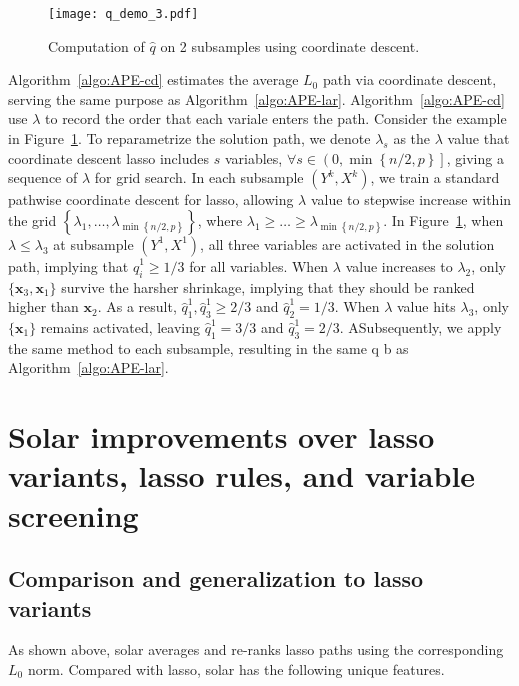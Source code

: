 \documentclass[12pt]{article}
\begin{document}
\begin{figure}[h]
  \centering
  \texttt{[image: q\_demo\_3.pdf]}
  \caption{Computation of $\widehat{q}$ on 2 subsamples using coordinate descent.}
  \label{fig:q_demo_3}
\end{figure}

Algorithm~\ref{algo:APE-cd} estimates the average $L_0$ path via coordinate descent, serving the same purpose
as Algorithm~\ref{algo:APE-lar}. Algorithm~\ref{algo:APE-cd} use $\lambda$ to record the order that each variale enters the path. Consider the example in Figure~\ref{fig:q_demo_3}. To reparametrize the solution path, we denote $\lambda_s$ as the $\lambda$ value that coordinate descent lasso includes $s$ variables, $\forall s\in \left( 0, \min \left\{ n/2, p \right\} \right]$, giving a sequence of $\lambda$ for grid search. In each subsample $\left( Y^k, X^k \right)$, we train a standard pathwise coordinate descent for lasso, allowing $\lambda$ value to stepwise increase within the grid $\left\{\lambda_1, \ldots, \lambda_{ \min \left\{ n/2, p \right\} } \right\}$, where $\lambda_1 \geqslant \ldots \geqslant \lambda_{ \min \left\{ n/2, p \right\} }$. In Figure~\ref{fig:q_demo_3}, when $\lambda \leqslant \lambda_3$ at subsample $\left( Y^1, X^1 \right)$, all three variables are activated in the solution path, implying that $\widehat{q}^1_i \geqslant 1/3$ for all variables. When $\lambda$ value increases to $\lambda_2$, only $\{\mathbf{x}_3, \mathbf{x}_1\}$ survive the harsher shrinkage, implying that they should be ranked higher than $\mathbf{x}_2$. As a result, $\widehat{q}^1_1, \widehat{q}^1_3 \geqslant 2/3$ and $\widehat{q}^1_2 = 1/3$. When $\lambda$ value hits $\lambda_3$, only $\{\mathbf{x}_1\}$ remains activated, leaving $\widehat{q}^1_1 = 3/3$ and $\widehat{q}^1_3 = 2/3$. ASubsequently, we apply the same method to each subsample, resulting in the same q b as Algorithm~\ref{algo:APE-lar}.

\section{Solar improvements over lasso variants, lasso rules, and variable screening \label{section:adv}}

\subsection{Comparison and generalization to lasso variants}

As shown above, solar averages and re-ranks lasso paths using the corresponding $L_0$ norm. Compared with lasso, solar has the following unique features.
\end{document}
